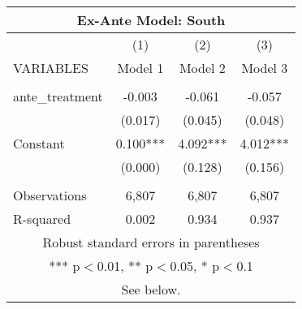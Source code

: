 \begin{tabular}{lccc}
\multicolumn{4}{c}{Ex-Ante Model: South} \\ \hline
 & (1) & (2) & (3) \\
VARIABLES & Model 1 & Model 2 & Model 3 \\ \hline
 &  &  &  \\
ante\_treatment & -0.003 & -0.061 & -0.057 \\
 & (0.017) & (0.045) & (0.048) \\
Constant & 0.100*** & 4.092*** & 4.012*** \\
 & (0.000) & (0.128) & (0.156) \\
 &  &  &  \\
Observations & 6,807 & 6,807 & 6,807 \\
 R-squared & 0.002 & 0.934 & 0.937 \\ \hline
\multicolumn{4}{c}{ Robust standard errors in parentheses} \\
\multicolumn{4}{c}{ *** p$<$0.01, ** p$<$0.05, * p$<$0.1} \\
\multicolumn{4}{c}{ See below.} \\
\end{tabular}

